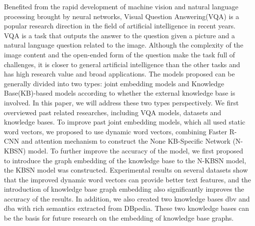 
\begin{englishabstract}
	Benefited from the rapid development of machine vision and natural language processing brought by neural networks, Visual Question Answering(VQA) is a popular research direction in the field of artificial intelligence in recent years. VQA is a task that outputs the answer to the question given a picture and a natural language question related to the image. Although the complexity of the image content and the open-ended form of the question make the task full of challenges, it is closer to general artificial intelligence than the other tasks and has high research value and broad applications. The models proposed can be generally divided into two types: joint embedding models and Knowledge Base(KB)-based models according to whether the external knowledge base is involved. In this paper, we will address these two types perspectively. We first overviewed past related researches, including VQA models, datasets and knowledge bases. To improve past joint embedding models, which all used static word vectors, we proposed to use dynamic word vectors, combining Faster R-CNN and attention mechanism to construct the None KB-Specific Network (N-KBSN) model. To further improve the accuracy of the model, we first proposed to introduce the graph embedding of the knowledge base to the N-KBSN model, the KBSN model was constructed. Experimental results on several datasets show that the improved dynamic word vectors can provide better text features, and the introduction of knowledge base graph embedding also significantly improves the accuracy of the results. In addition, we also created two knowledge bases dbv and dba with rich semantics extracted from DBpedia. These two knowledge bases can be the basis for future research on the embedding of knowledge base graphs.
	
\end{englishabstract}



